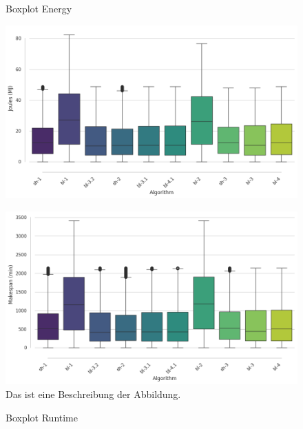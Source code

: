 \begin{figure}[H]
    \caption{Boxplot Energy}
    \includegraphics[scale=0.5]{fig/06/06-boxplot-energy.png}
    \caption{Boxplot Runtime}
    \includegraphics[scale=0.5]{fig/06/06-boxplot-runtime.png}
    \label{fig:boxplot_runtime}
    \newline
    \tiny
    Das ist eine Beschreibung der Abbildung.
\end{figure}

